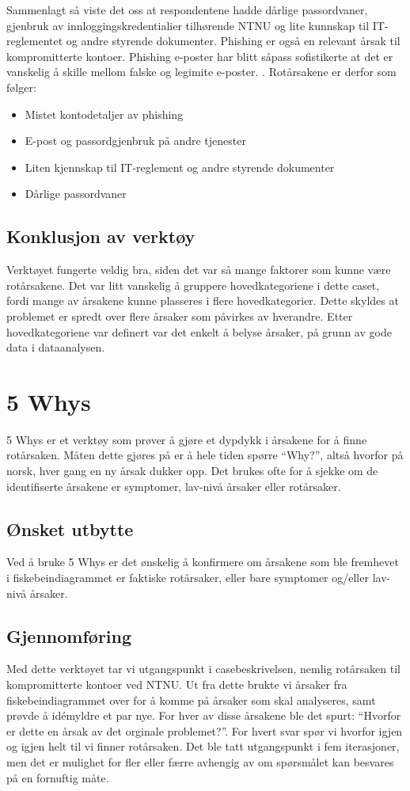 Sammenlagt så viste det oss at respondentene hadde dårlige passordvaner, gjenbruk av innloggingskredentialier tilhørende NTNU og lite kunnskap til IT-reglementet og andre styrende dokumenter. Phishing er også en relevant årsak til kompromitterte kontoer. Phishing e-poster har blitt såpass sofistikerte at det er vanskelig å skille mellom falske og legimite e-poster. \cite{SophPhish}. Rotårsakene er derfor som følger: 

\begin{itemize}
    \item Mistet kontodetaljer av phishing
    \item E-post og passordgjenbruk på andre tjenester
    \item Liten kjennskap til IT-reglement og andre styrende dokumenter
    \item Dårlige passordvaner
\end{itemize}

\subsection{Konklusjon av verktøy}
Verktøyet fungerte veldig bra, siden det var så mange faktorer som kunne være rotårsakene. Det var litt vanskelig å gruppere hovedkategoriene i dette caset, fordi mange av årsakene kunne plasseres i flere hovedkategorier. Dette skyldes at problemet er spredt over flere årsaker som påvirkes av hverandre. Etter hovedkategoriene var definert var det enkelt å belyse årsaker, på grunn av gode data i dataanalysen. 

\section{5 Whys}
5 Whys er et verktøy som prøver å gjøre et dypdykk i årsakene for å finne rotårsaken. Måten dette gjøres på er å hele tiden spørre ``Why?'', altså hvorfor på norsk, hver gang en ny årsak dukker opp. Det brukes ofte for å sjekke om de identifiserte årsakene er symptomer, lav-nivå årsaker eller rotårsaker. 

\subsection{Ønsket utbytte}
Ved å bruke 5 Whys er det ønskelig å konfirmere om årsakene som ble fremhevet i fiskebeindiagrammet er faktiske rotårsaker, eller bare symptomer og/eller lav-nivå årsaker. 

\subsection{Gjennomføring}
Med dette verktøyet tar vi utgangspunkt i casebeskrivelsen, nemlig rotårsaken til kompromitterte kontoer ved NTNU. Ut fra dette brukte vi årsaker fra fiskebeindiagrammet over for å komme på årsaker som skal analyseres, samt prøvde å idémyldre et par nye. For hver av disse årsakene ble det spurt: ``Hvorfor er dette en årsak av det orginale problemet?''. For hvert svar spør vi hvorfor igjen og igjen helt til vi finner rotårsaken. Det ble tatt utgangspunkt i fem iterasjoner, men det er mulighet for fler eller færre avhengig av om spørsmålet kan besvares på en fornuftig måte. 

